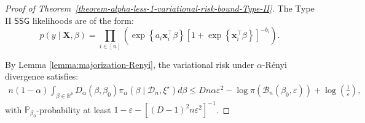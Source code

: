 \documentclass[12pt]{article}
\numberwithin{equation}{section}
\begin{document}
\begin{proof}[Proof of Theorem~\ref{theorem-alpha-less-1-variational-risk-bound-Type-II}]
The Type II $\mathsf{SSG}$ likelihoods are of the form:
%
\begin{equation}\label{eq:proof-theorem2-1}
p(y\mid \mathbf{X}, \beta) = \prod_{i\in [n]}\left(\exp\left\{a_i\mathbf{x}_{i}^{\top}\beta\right\}\left[1 + \exp\left\{\mathbf{x}_{i}^{\top}\beta\right\}\right]^{- b_i}\right).
\end{equation}

By Lemma \ref{lemma:majorization-Renyi}, the variational risk under $\alpha$-R\'{e}nyi divergence satisfies:
\begin{align}\label{eq:proof-theorem2-2}
        n(1-\alpha)\int_{\beta\in \mathbb{R}^{p}}D_{\alpha}(\beta, \beta_{0})\pi_{\alpha}(\beta \mid \mathcal{D}_n, \xi^{\star})d\beta
        \leq Dn\alpha\varepsilon^2 - \log \pi(\mathcal{B}_n(\beta_0, \varepsilon)) + \log\left(\frac{1}{\varepsilon}\right),
\end{align}
with $\mathbb{P}_{\beta_0}$-probability at least $1-\varepsilon-[(D-1)^2n\varepsilon^2]^{-1}$.


\end{proof}
\end{document}
